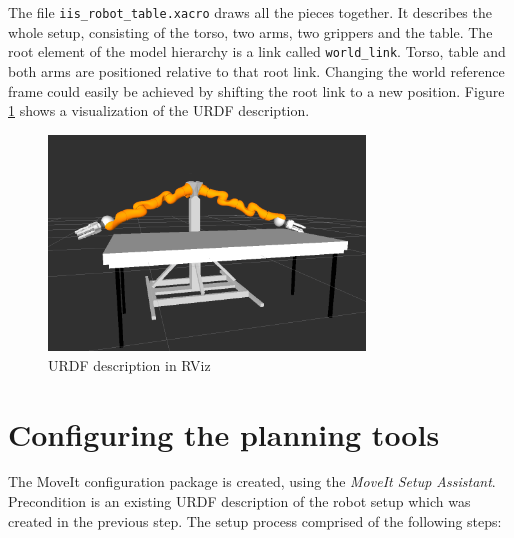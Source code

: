 The file \texttt{iis\_robot\_table.xacro} draws all the pieces together. It describes the whole setup, consisting of the torso, two arms, two grippers and the table. The root element of the model hierarchy is a link called \texttt{world\_link}. Torso, table and both arms are positioned relative to that root link. Changing the world reference frame could easily be achieved by shifting the root link to a new position. Figure \ref{fig:robot_table} shows a visualization of the URDF description.
\begin{figure}
	\centering
  	\includegraphics[width=0.75\textwidth]{images/iis_robot_table.png}
	\caption{URDF description in RViz}
	\label{fig:robot_table}
\end{figure}

\section{Configuring the planning tools}
\label{sec:moveit_assistant}

The MoveIt configuration package is created, using the \emph{MoveIt Setup Assistant}. Precondition is an existing URDF description of the robot setup which was created in the previous step.
The setup process comprised of the following steps:

